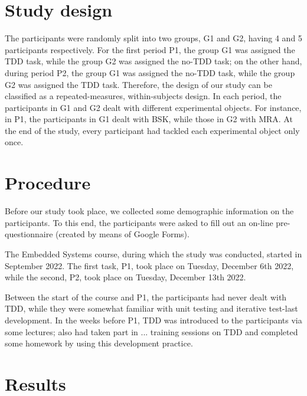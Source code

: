 \section{Study design}
The participants were randomly split into two groups, G1 and G2, having 4 and 5 participants respectively. For the first period P1, the group G1 was assigned the TDD task, while the group G2 was assigned the no-TDD task; on the other hand, during period P2, the group G1 was assigned the no-TDD task, while the group G2 was assigned the TDD task.
Therefore, the design of our study can be classified as a repeated-measures, within-subjects design. In each period, the participants in G1 and G2 dealt with different experimental objects. For instance, in P1, the participants in G1 dealt with BSK, while those in G2 with MRA. At the end of the study, every participant had tackled each experimental object only once.

\section{Procedure}
Before our study took place, we collected some demographic information on the participants. To this end, the participants were asked to fill out an on-line pre-questionnaire (created by means of Google Forms).

The Embedded Systems course, during which the study was conducted, started in September 2022. The first task, P1, took place on Tuesday, December 6th 2022, while the second, P2, took place on Tuesday, December 13th 2022.

Between the start of the course and P1, the participants had never dealt with TDD, while they were somewhat familiar with unit testing and iterative test-last development. In the weeks before P1, TDD was introduced to the participants via some lectures; also had taken part in ... training sessions on TDD and completed some homework by using this development practice.


\section{Results}